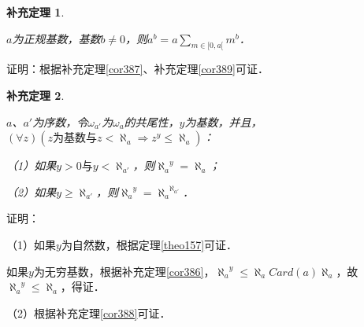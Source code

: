 \documentclass[12pt, a4paper, oneside]{book}
\newtheorem{cor}{补充定理}
\begin{document}
			\begin{cor}\label{cor390}
				\hfill\par
				$a$为正规基数，基数$b\neq 0$，则$a^b=a\sum\limits_{m\in [0, a[}m^b$．
			\end{cor}
			证明：根据补充定理\ref{cor387}、补充定理\ref{cor389}可证．
			
			\begin{cor}\label{cor391}
				\hfill\par
				$a$、$a'$为序数，令$\omega_{a'}$为$\omega_a$的共尾性，$y$为基数，并且，$(\forall z)(z\text{为基数}\text{与}z<\aleph_a\Rightarrow z^y\leq \aleph_a)$：
				\par
				（1）如果$y>0\text{与}y<\aleph_{a'}$，则${\aleph_a}^y=\aleph_a$；
				\par
				（2）如果$y\geq \aleph_{a'}$，则${\aleph_a}^y={\aleph_a}^{\aleph_{a'}}$．
			\end{cor}
			证明：
			\par
			（1）如果$y$为自然数，根据定理\ref{theo157}可证．
			\par
			如果$y$为无穷基数，根据补充定理\ref{cor386}，${\aleph_a}^y\leq \aleph_aCard(a)\aleph_a$，故${\aleph_a}^y\leq \aleph_a$，得证．
			\par
			（2）根据补充定理\ref{cor388}可证．
			
\end{document}

